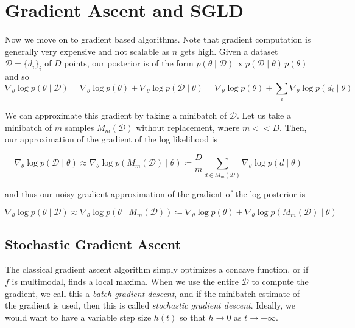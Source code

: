 \documentclass{article}
\begin{document}
\section{Gradient Ascent and SGLD}

    Now we move on to gradient based algorithms. Note that gradient computation is generally very expensive and not scalable as $n$ gets high. Given a dataset $\mathcal{D} = \{d_i\}_i$ of $D$ points, our posterior is of the form $p(\theta \mid \mathcal{D}) \propto p(\mathcal{D} \mid \theta) \, p(\theta)$ and so 
    \begin{equation}
      \nabla_\theta \log p(\theta \mid \mathcal{D}) = \nabla_\theta \log{p(\theta)} + \nabla_\theta \log{p(\mathcal{D} \mid \theta)} = \nabla_\theta \log{p(\theta)} + \sum_i \nabla_\theta \log{p(d_i \mid \theta)}
    \end{equation}

    We can approximate this gradient by taking a minibatch of $\mathcal{D}$. Let us take a minibatch of $m$ samples $M_m (\mathcal{D})$ without replacement, where $m << D$. Then, our approximation of the gradient of the log likelihood is 

    \begin{equation}
      \nabla_\theta \log{p(\mathcal{D} \mid \theta)} \approx \nabla_\theta \log{p (M_m (\mathcal{D}) \mid \theta)} \coloneqq \frac{D}{m} \sum_{d \in M_m(\mathcal{D})} \nabla_\theta \log{p(d \mid \theta)}
    \end{equation}

    and thus our noisy gradient approximation of the gradient of the log posterior is 

    \begin{equation}
      \nabla_\theta \log{p(\theta \mid \mathcal{D})} \approx \nabla_\theta \log{p(\theta \mid M_m(\mathcal{D}))} \coloneqq \nabla_\theta \log{p(\theta)} + \nabla_\theta \log{p (M_m (\mathcal{D}) \mid \theta)}
    \end{equation}

  \subsection{Stochastic Gradient Ascent}

    The classical gradient ascent algorithm simply optimizes a concave function, or if $f$ is multimodal, finds a local maxima. When we use the entire $\mathcal{D}$ to compute the gradient, we call this a \textit{batch gradient descent}, and if the minibatch estimate of the gradient is used, then this is called \textit{stochastic gradient descent}. Ideally, we would want to have a variable step size $h(t)$ so that $h \rightarrow 0$ as $t \rightarrow + \infty$. 
\end{document}
